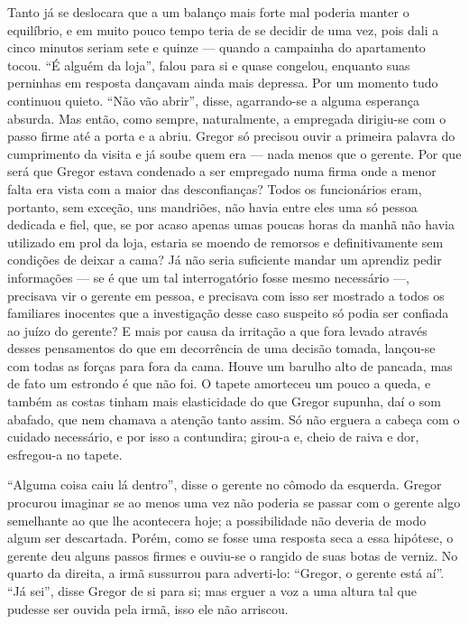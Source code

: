Tanto já se deslocara que a um balanço mais forte mal poderia
manter o equilíbrio, e em muito pouco tempo teria de se decidir de uma
vez, pois dali a cinco minutos seriam sete e quinze --- quando a campainha
do apartamento tocou. “É alguém da loja”, falou para si e quase congelou,
enquanto suas perninhas em resposta dançavam ainda mais depressa. Por um
momento tudo continuou quieto. “Não vão abrir”, disse, agarrando-se a
alguma esperança absurda. Mas então, como sempre, naturalmente, a
empregada dirigiu-se com o passo firme até a porta e a abriu. Gregor só
precisou ouvir a primeira palavra do cumprimento da visita e já soube quem
era --- nada menos que o gerente. Por que será que Gregor estava condenado a
ser empregado numa firma onde a menor falta era vista com a maior das
desconfianças? Todos os funcionários eram, portanto, sem exceção, uns
mandriões, não havia entre eles uma só pessoa dedicada e fiel, que, se por
acaso apenas umas poucas horas da manhã não havia utilizado em prol da
loja, estaria se moendo de remorsos e definitivamente sem condições de
deixar a cama? Já não seria suficiente mandar um aprendiz pedir
informações --- se é que um tal interrogatório fosse mesmo necessário ---,
precisava vir o gerente em pessoa, e precisava com isso ser mostrado a
todos os familiares inocentes que a investigação desse caso suspeito só
podia ser confiada ao juízo do gerente? E mais por causa da irritação a
que fora levado através desses pensamentos do que em decorrência de uma
decisão tomada, lançou-se com todas as forças para fora da cama. Houve um
barulho alto de pancada, mas de fato um estrondo é que não foi. O tapete
amorteceu um pouco a queda, e também as costas tinham mais elasticidade do
que Gregor supunha, daí o som abafado, que nem chamava a atenção tanto
assim. Só não erguera a cabeça com o cuidado necessário, e por isso a
contundira; girou-a e, cheio de raiva e dor, esfregou-a no tapete.

“Alguma coisa caiu lá dentro”, disse o gerente no cômodo da esquerda.
Gregor procurou imaginar se ao menos uma vez não poderia se passar com o
gerente algo semelhante ao que lhe acontecera hoje; a possibilidade não
deveria de modo algum ser descartada. Porém, como se fosse uma resposta
seca a essa hipótese, o gerente deu alguns passos firmes e ouviu-se o
rangido de suas botas de verniz. No quarto da direita, a irmã sussurrou
para adverti-lo: “Gregor, o gerente está aí”. “Já sei”, disse Gregor de si
para si; mas erguer a voz a uma altura tal que pudesse ser ouvida pela
irmã, isso ele não arriscou.

